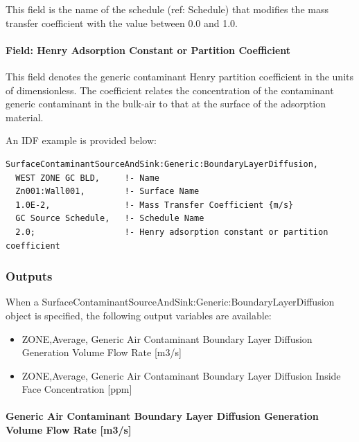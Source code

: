 This field is the name of the schedule (ref: Schedule) that modifies the mass transfer coefficient with the value between 0.0 and 1.0.

\paragraph{Field: Henry Adsorption Constant or Partition Coefficient}\label{field-henry-adsorption-constant-or-partition-coefficient}

This field denotes the generic contaminant Henry partition coefficient in the units of dimensionless. The coefficient relates the concentration of the contaminant generic contaminant in the bulk-air to that at the surface of the adsorption material.

An IDF example is provided below:

\begin{lstlisting}
SurfaceContaminantSourceAndSink:Generic:BoundaryLayerDiffusion,
  WEST ZONE GC BLD,     !- Name
  Zn001:Wall001,        !- Surface Name
  1.0E-2,               !- Mass Transfer Coefficient {m/s}
  GC Source Schedule,   !- Schedule Name
  2.0;                  !- Henry adsorption constant or partition coefficient
\end{lstlisting}

\subsubsection{Outputs}\label{outputs-11-003}

When a Sur\-face\-Con\-taminant\-Source\-And\-Sink:\-Generic:\-Boundary\-Layer\-Diffusion object is specified, the following output variables are available:

\begin{itemize}
  \tightlist
  \item
    ZONE,Average, Generic Air Contaminant Boundary Layer Diffusion Generation Volume Flow Rate {[}m3/s{]}
  \item
    ZONE,Average, Generic Air Contaminant Boundary Layer Diffusion Inside Face Concentration {[}ppm{]}
\end{itemize}

\paragraph{Generic Air Contaminant Boundary Layer Diffusion Generation Volume Flow Rate {[}m3/s{]}}\label{generic-air-contaminant-boundary-layer-diffusion-generation-volume-flow-rate-m3s}

